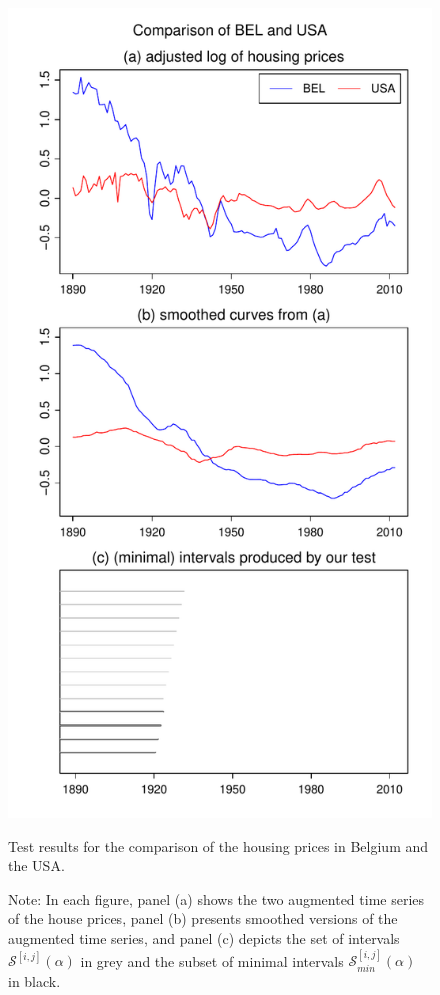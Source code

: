 \documentclass[a4paper,12pt]{article}
\begin{document}
\begin{figure}[t!]
\hspace{0.25cm}
\begin{minipage}[t]{0.49\textwidth}
\includegraphics[width=\textwidth]{Plots/hp/hp_BEL_vs_USA}
\caption{Test results for the comparison of the housing prices in Belgium and the USA.}\label{fig:hp:Belgium:USA}
\end{minipage}
\caption*{Note: In each figure, panel (a) shows the two augmented time series of the house prices, panel (b) presents smoothed versions of the augmented time series, and panel (c) depicts the set of intervals $\mathcal{S}^{[i, j]}(\alpha)$ in grey and the subset of minimal intervals $\mathcal{S}^{[i, j]}_{min}(\alpha)$ in black.}
\end{figure}
\end{document}
